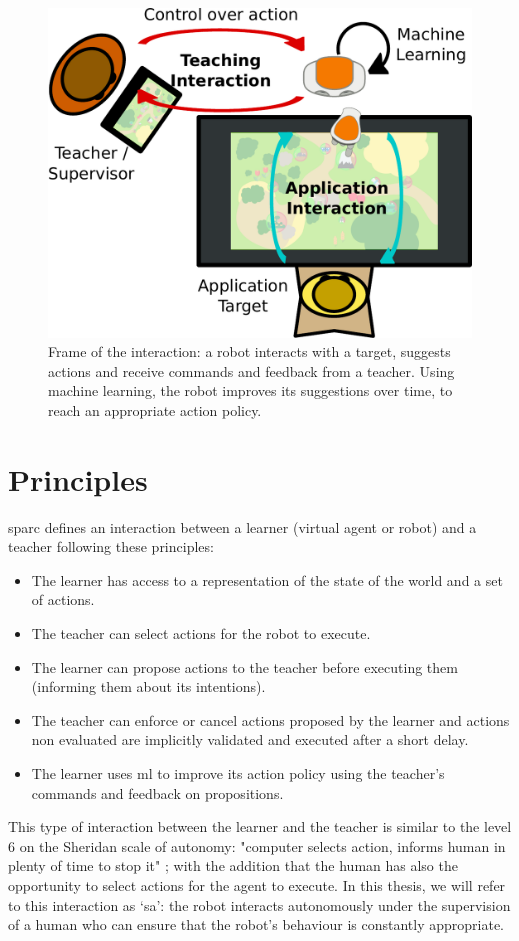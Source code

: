 \begin{figure}[ht]
	\includegraphics[width=.6\linewidth]{setup.pdf}
	\centering
	\caption{Frame of the interaction: a robot interacts with a target, suggests actions and receive commands and feedback from a teacher. Using machine learning, the robot improves its suggestions over time, to reach an appropriate action policy.}
	\label{fig:frame}
\end{figure}

\section{Principles} \label{sec:sparc_principles}

\gls{sparc} defines an interaction between a learner (virtual agent or robot) and a teacher following these principles:
\begin{itemize}
	\item The learner has access to a representation of the state of the world and a set of actions.
	\item The teacher can select actions for the robot to execute.
	\item The learner can propose actions to the teacher before executing them (informing them about its intentions).
	\item The teacher can enforce or cancel actions proposed by the learner and actions non evaluated are implicitly validated and executed after a short delay.
	\item The learner uses \gls{ml} to improve its action policy using the teacher's commands and feedback on propositions.
\end{itemize} 

This type of interaction between the learner and the teacher is similar to the level 6 on the Sheridan scale of autonomy: "computer selects action, informs human in plenty of time to stop it" \citep{sheridan1978human}; with the addition that the human has also the opportunity to select actions for the agent to execute. In this thesis, we will refer to this interaction as `\gls{sa}': the robot interacts autonomously under the supervision of a human who can ensure that the robot's behaviour is constantly appropriate.

